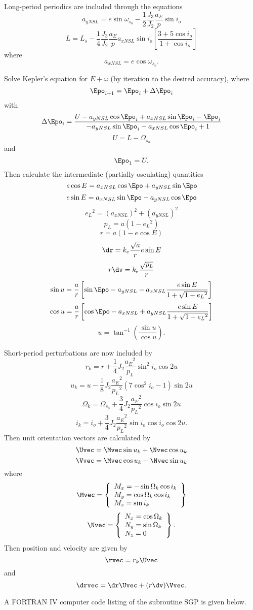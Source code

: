 Long-period periodics are included through the equations
\[a_{yNSL}=e\sin\omega_{s_o}-\dfrac12\dfrac{J_3}{J_2}\dfrac{a_E}p\sin i_o\]
\[L=L_s-\dfrac14\dfrac{J_3}{J_2}\dfrac{a_E}pa_{xNSL}\sin i_o
\left[\dfrac{3+5\cos i_o}{1+\cos i_o}\right]\]
where
\[a_{xNSL}=e\cos\omega_{s_o}.\]

Solve Kepler's equation for $E+\omega$ (by iteration to the desired accuracy),
where
\[\Epo_{i+1}=\Epo_i+\Delta\Epo_i\]
with
\[\Delta\Epo_i=\dfrac{U-a_{yNSL}\cos\Epo_i+a_{xNSL}\sin\Epo_i-\Epo_i}
{-a_{yNSL}\sin\Epo_i-a_{xNSL}\cos\Epo_i+1}\]
\[U=L-\Omega_{s_o}\]
and
\[\Epo_1=U.\]
Then calculate the intermediate (partially osculating) quantities
\[e\cos E=a_{xNSL}\cos\Epo+a_{yNSL}\sin\Epo\]
\[e\sin E=a_{xNSL}\sin\Epo-a_{yNSL}\cos\Epo\]
\[e_L{}^2=(a_{xNSL})^2+(a_{yNSL})^2\]
\[p_L=a(1-e_L{}^2)\]
\[r=a(1-e\cos E)\]
\[\dr=k_e\dfrac{\sqrt{a}}re\sin E\]
\[r\dv=k_e\dfrac{\sqrt{p_L}}r\]
\[\sin u=\dfrac{a}r\left[\sin\Epo-a_{yNSL}-a_{xNSL}
\dfrac{e\sin E}{1+\sqrt{1-e_L{}^2}}\right]\]
\[\cos u=\dfrac{a}r\left[\cos\Epo-a_{xNSL}+a_{yNSL}
\dfrac{e\sin E}{1+\sqrt{1-e_L{}^2}}\right]\]
\[u=\tan^{-1}\left(\dfrac{\sin u}{\cos u}\right).\]

Short-period perturbations are now included by
\[r_k=r+\dfrac14J_2\dfrac{a_E{}^2}{p_L}\sin^2i_o\cos 2u\]
\[u_k=u-\dfrac18J_2\dfrac{a_E{}^2}{p_L{}^2}(7\cos^2i_o-1)\sin 2u\]
\[\Omega_k=\Omega_{s_o}+\dfrac34J_2\dfrac{a_E{}^2}{p_L{}^2}\cos i_o\sin 2u\]
\[i_k=i_o+\dfrac34J_2\dfrac{a_E{}^2}{p_L{}^2}\sin i_o\cos i_o\cos 2u.\]
Then unit orientation vectors are calculated by
\[\Uvec=\Mvec\sin u_k+\Nvec\cos u_k\]
\[\Vvec=\Mvec\cos u_k-\Nvec\sin u_k\]
where
\[\Mvec=\left\{\begin{array}{l}
                          M_x=-\sin\Omega_k\cos i_k\\
                          M_y=\cos\Omega_k\cos i_k\\
                          M_z=\sin i_k
                         \end{array}\right\}\]
\[\Nvec=\left\{\begin{array}{l}
                          N_x=\cos\Omega_k\\
                          N_y=\sin\Omega_k\\
                          N_z=0
                         \end{array}\right\}.\]
Then position and velocity are given by
\[\rvec=r_k\Uvec\]
and
\[\drvec=\dr\Uvec+(r\dv)\Vvec.\]

A FORTRAN IV computer code listing of the subroutine SGP is given below.
\newpage

\newpage

